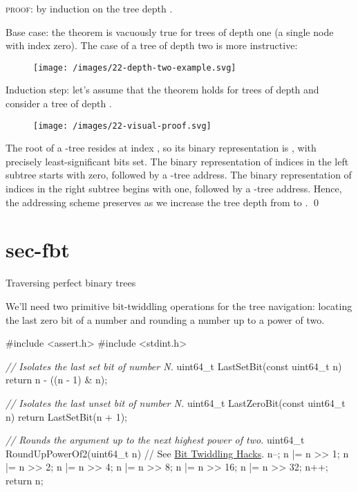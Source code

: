 \documentclass{article}
\begin{document}
\textsc{proof}: by induction on the tree depth .

Base case: the theorem is vacuously true for trees of depth one (a single node with index zero).
The case of a tree of depth two is more instructive:

\begin{figure}[grayscale-diagram]
  \texttt{[image: /images/22-depth-two-example.svg]}
\end{figure}

Induction step: let's assume that the theorem holds for trees of depth  and consider a tree of depth .

\begin{figure}[grayscale-diagram]
  \texttt{[image: /images/22-visual-proof.svg]}
\end{figure}

The root of a -tree resides at index , so its binary representation is , with precisely  least-significant bits set.
The binary representation of indices in the left subtree starts with zero, followed by a -tree address.
The binary representation of indices in the right subtree begins with one, followed by a -tree address.
Hence, the addressing scheme preserves as we increase the tree depth from  to .
\qed

\section{sec-fbt}{Traversing perfect binary trees}

We'll need two primitive bit-twiddling operations for the tree navigation: locating the last zero bit of a number and rounding a number up to a power of two.

\begin{code}[c]
#include <assert.h>
#include <stdint.h>

\emph{// Isolates the last set bit of number N.}
uint64_t LastSetBit(const uint64_t n) {
    return n - ((n - 1) & n);
}

\emph{// Isolates the last unset bit of number N.}
uint64_t LastZeroBit(const uint64_t n) {
    return LastSetBit(n + 1);
}

\emph{// Rounds the argument up to the next highest power of two.}
uint64_t RoundUpPowerOf2(uint64_t n) {
    // See \href{https://graphics.stanford.edu/~seander/bithacks.html#RoundUpPowerOf2}{Bit Twiddling Hacks}.
    n--;
    n |= n >> 1;
    n |= n >> 2;
    n |= n >> 4;
    n |= n >> 8;
    n |= n >> 16;
    n |= n >> 32;
    n++;
    return n;
}
\end{code}
\end{document}

